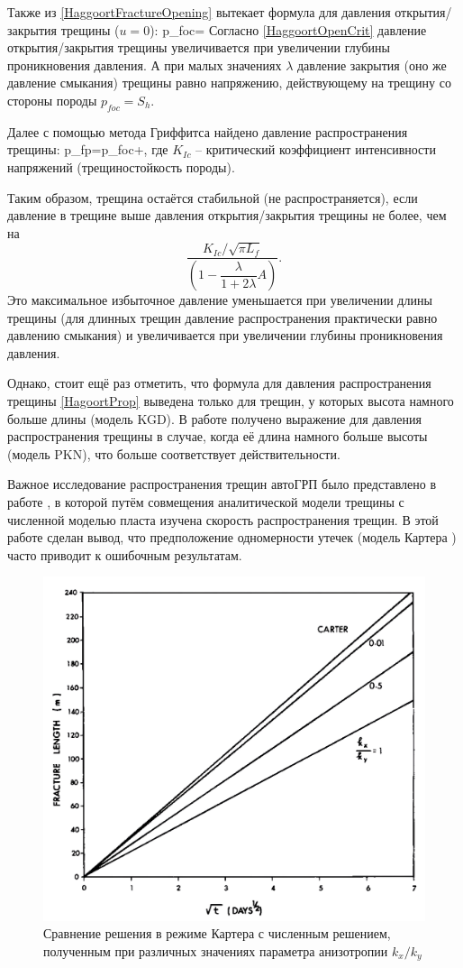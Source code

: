 Также из \eqref{HaggoortFractureOpening} вытекает формула для давления открытия/закрытия трещины ($u=0$):
\beq\label{HaggoortOpenCrit}
p_{\!f\!oc}=
\eeq
Согласно \eqref{HaggoortOpenCrit} давление открытия/закрытия трещины увеличивается при увеличении глубины проникновения давления.
А при малых значениях $\lambda$ давление закрытия (оно же давление смыкания) трещины равно напряжению, действующему на трещину со стороны породы $p_{\!f\!oc}=S_h$.

Далее с помощью метода Гриффитса \cite{griffith} найдено давление распространения трещины:
\beq\label{HagoortProp}
p_{\!f\!p}=p_{\!f\!oc}+,
\eeq
где $K_{Ic}$ -- критический коэффициент интенсивности напряжений (трещиностойкость породы).

Таким образом, трещина остаётся стабильной (не распространяется), если давление в трещине выше давления открытия/закрытия трещины не более, чем на
$$
\frac{K_{Ic}/\sqrt{\pi L_{\!f}}}{\left(1-\dfrac{\lambda}{1+2\lambda}A\right)}.
$$
Это максимальное избыточное давление уменьшается при увеличении длины трещины (для длинных трещин давление распространения практически равно давлению смыкания) и увеличивается при увеличении глубины проникновения давления.

Однако, стоит ещё раз отметить, что формула для давления распространения трещины \eqref{HagoortProp} выведена только для трещин, у которых высота намного больше длины (модель KGD).
В работе \cite{kabanova_shel} получено выражение для давления распространения трещины в случае, когда её длина намного больше высоты (модель PKN), что больше соответствует действительности.

Важное исследование распространения трещин автоГРП было представлено в работе \cite{hagoort}, в которой путём совмещения аналитической модели трещины с численной моделью пласта изучена скорость распространения трещин.
В этой работе сделан вывод, что предположение одномерности утечек (модель Картера \cite{karter}) часто приводит к ошибочным результатам.

\begin{figure}[H] 
\center
\includegraphics[width=.55\linewidth]{images/carter_vs_2D_leak_off.jpg}
\caption{Сравнение решения в режиме Картера с численным решением, полученным при различных значениях параметра анизотропии $k_x/k_y$ \cite{hagoort}} 
\label{fig:carter_vs_2D_leak_off}  
\end{figure}

